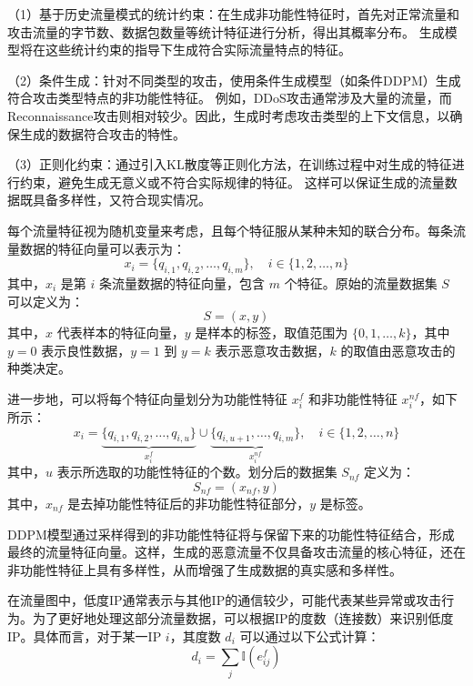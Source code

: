 \documentclass[promaster]{thesis-uestc}
\begin{document}
（1）基于历史流量模式的统计约束：在生成非功能性特征时，首先对正常流量和攻击流量的字节数、数据包数量等统计特征进行分析，得出其概率分布。
生成模型将在这些统计约束的指导下生成符合实际流量特点的特征。

（2）条件生成：针对不同类型的攻击，使用条件生成模型（如条件DDPM）生成符合攻击类型特点的非功能性特征。
例如，DDoS攻击通常涉及大量的流量，而Reconnaissance攻击则相对较少。因此，生成时考虑攻击类型的上下文信息，以确保生成的数据符合攻击的特性。

（3）正则化约束：通过引入KL散度等正则化方法，在训练过程中对生成的特征进行约束，避免生成无意义或不符合实际规律的特征。
这样可以保证生成的流量数据既具备多样性，又符合现实情况。

每个流量特征视为随机变量来考虑，且每个特征服从某种未知的联合分布。每条流量数据的特征向量可以表示为：
\begin{equation}
x_i = \{ q_{i,1}, q_{i,2}, \dots, q_{i,m} \}, \quad i \in \{1, 2, \dots, n\}
\end{equation}
其中，\(x_i\) 是第 \(i\) 条流量数据的特征向量，包含 \(m\) 个特征。原始的流量数据集 \(S\) 可以定义为：
\begin{equation}
S = (x, y)
\end{equation}
其中，\(x\) 代表样本的特征向量，\(y\) 是样本的标签，取值范围为 \(\{0, 1, \dots, k\}\)，其中 \(y = 0\) 表示良性数据，\(y = 1\) 到 \(y = k\) 表示恶意攻击数据，\(k\) 的取值由恶意攻击的种类决定。

进一步地，可以将每个特征向量划分为功能性特征 \(x_i^f\) 和非功能性特征 \(x_i^{nf}\)，如下所示：
\begin{equation}
x_i = \underbrace{\{ q_{i,1}, q_{i,2}, \dots, q_{i,u} \}}_{x_i^f} \cup \underbrace{\{ q_{i,u+1}, \dots, q_{i,m} \}}_{x_i^{nf}}, \quad i \in \{1, 2, \dots, n\}
\end{equation}
其中，\(u\) 表示所选取的功能性特征的个数。划分后的数据集 \(S_{nf}\) 定义为：
\begin{equation}
S_{nf} = (x_{nf}, y)
\end{equation}
其中，\(x_{nf}\) 是去掉功能性特征后的非功能性特征部分，\(y\) 是标签。

DDPM模型通过采样得到的非功能性特征将与保留下来的功能性特征结合，形成最终的流量特征向量。这样，生成的恶意流量不仅具备攻击流量的核心特征，还在非功能性特征上具有多样性，从而增强了生成数据的真实感和多样性。

在流量图中，低度IP通常表示与其他IP的通信较少，可能代表某些异常或攻击行为。为了更好地处理这部分流量数据，可以根据IP的度数（连接数）来识别低度IP。具体而言，对于某一IP \(i\)，其度数 \(d_i\) 可以通过以下公式计算：
\begin{equation}
d_i = \sum_{j} \mathbb{I}(e_{ij}^f)
\end{equation}
\end{document}
